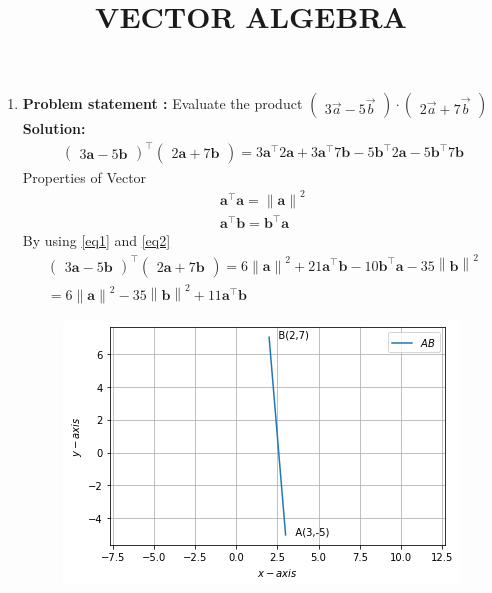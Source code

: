 \documentclass[12pt]{article}\usepackage{graphicx}
\title{\mytitle}
\newcommand{\myvec}[1]{\ensuremath{\begin{pmatrix}#1\end{pmatrix}}}
\let\vec\mathbf
\let\vec\mathbf
\providecommand{\norm}[1]{\left\lVert#1\right\rVert}
\newcommand{\solution}{\noindent \textbf{Solution: }}
\begin{document}
\begin{center}
\title{\textbf{VECTOR ALGEBRA}}
\maketitle
\end{center}
\begin{enumerate}
\item\textbf{Problem statement :} Evaluate the product $\myvec{3\overrightarrow{a}-5\overrightarrow{b}}\cdot\myvec{2\overrightarrow{a}+7\overrightarrow{b}}$
\solution
\begin{align}
    \myvec{3\vec{a}-5\vec{b}}^{\top}\myvec{2\vec{a}+7\vec{b}}= 3\vec{a}^{\top}2\vec{a}+3\vec{a}^{\top}7\vec{b}-5\vec{b}^{\top}2\vec{a}-5\vec{b}^{\top}7\vec{b}
\end{align}
Properties of Vector
\begin{align}
    \vec{a}^{\top}\vec{a} = \norm{\vec{a}}^2
    \label{eq1}  
    \\
    \vec{a}^{\top}\vec{b} = \vec{b}^{\top}\vec{a}
    \label{eq2}
\end{align}
By using \eqref{eq1} and \eqref{eq2}
\begin{align}
    \myvec{3\vec{a}-5\vec{b}}^{\top}\myvec{2\vec{a}+7\vec{b}} = 6\norm{\vec{a}}^2 +21\vec{a}^{\top}\vec{b}-10\vec{b}^{\top}\vec{a}-35\norm{\vec{b}}^2 \\
     =6\norm{\vec{a}}^2-35\norm{\vec{b}}^2+11\vec{a}^{\top}\vec{b}
\end{align}
\begin{figure}[!h]
 \begin{center}
  \includegraphics[width=\columnwidth]{./fig.png}
 \end{center}
\caption{}
\label{fig:Fig1}
\end{figure}
\end{enumerate}
\end{document}
